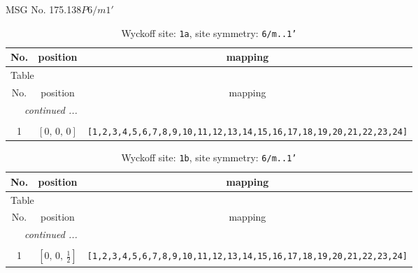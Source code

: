 \documentclass[fleqn,8pt]{jsarticle}
\begin{document}
\setcounter{MaxMatrixCols}{32}

\renewcommand{\tablename}{Table~}
\renewcommand{\figurename}{Figure~}
\begin{center}
\LARGE
MSG No. 175.138\quad$P6/m1'$
\end{center}
\renewcommand{\arraystretch}{1.2}
\begin{longtable}{ccc}
\caption{Wyckoff site: {\tt 1a}, site symmetry: {\tt 6/m..1'}}
 \\
 \hline \hline
No. & position & mapping \\ \hline \endfirsthead

\multicolumn{2}{l}{\tablename\ \thetable{}} \\
 \hline \hline
No. & position & mapping \\ \hline \endhead

 \hline \hline
\multicolumn{2}{r}{\footnotesize\it continued ...} \\ \endfoot

 \hline \hline
\multicolumn{2}{r}{} \\ \endlastfoot

1 & $\left[ 0,\, 0,\, 0 \right]$ & {\tt [1,2,3,4,5,6,7,8,9,10,11,12,13,14,15,16,17,18,19,20,21,22,23,24]} \\
\end{longtable}
\renewcommand{\arraystretch}{1.2}
\begin{longtable}{ccc}
\caption{Wyckoff site: {\tt 1b}, site symmetry: {\tt 6/m..1'}}
 \\
 \hline \hline
No. & position & mapping \\ \hline \endfirsthead

\multicolumn{2}{l}{\tablename\ \thetable{}} \\
 \hline \hline
No. & position & mapping \\ \hline \endhead

 \hline \hline
\multicolumn{2}{r}{\footnotesize\it continued ...} \\ \endfoot

 \hline \hline
\multicolumn{2}{r}{} \\ \endlastfoot

1 & $\left[ 0,\, 0,\, \frac{1}{2} \right]$ & {\tt [1,2,3,4,5,6,7,8,9,10,11,12,13,14,15,16,17,18,19,20,21,22,23,24]} \\
\end{longtable}
\renewcommand{\arraystretch}{1.2}
\end{document}
